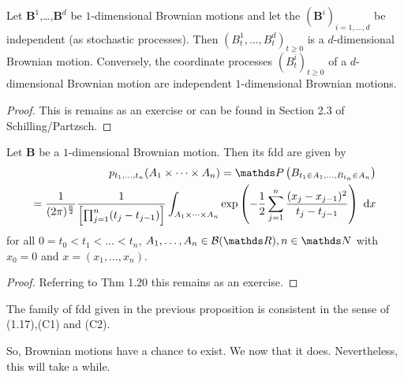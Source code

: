 \begin{prop}
Let $\textbf{B}^1$,\dots,$\textbf{B}^d$ be $1$-dimensional Brownian motions and
let the $(\textbf{B}^i)_{i=1,\dots,d}$ be independent (as stochastic processes).
Then $\left(B_t^1,\dots,B_t^d\right)_{t\geq 0}$ is a $d$-dimensional Brownian motion.
Conversely, the coordinate processes $\left(B_t^i\right)_{t \geq 0}$ of a $d$-dimensional Brownian motion are independent $1$-dimensional Brownian motions.
\end{prop}
\begin{proof}
This is remains as an exercise or can be found in Section 2.3 of Schilling/Partzsch.
\end{proof}

\begin{prop}
Let $\textbf{B}$ be a $1$-dimensional Brownian motion. Then its fdd are given by
\begin{align}
p_{t_1,\dots ,t_n}(A_1\times \dots \times A_n) = \Prob\left(B_{t_1\in A_1,\dots,B_{t_n}\in A_n}  \right) \nonumber \\
=\frac{1}{(2\pi)^{\frac{n}{2}}}\frac{1}{\left[\prod_{j=1}^n(t_j-t_{j-1})\right]} \int_{A_1\times \dots \times A_n} \exp\left(-\frac{1}{2}\sum_{j=1}^n \frac{(x_j-x_{j-1})^2}{t_j-t_{j-1}}\right)~\mathrm{d}x
\end{align}
for all $0=t_0<t_1<\dots < t_n$, $A_1, \dots , A_n \in  \Borel(\R), n\in \N$ with $x_0=0$ and $x=(x_1,\dots , x_n)$.
\end{prop}
\begin{proof}
Referring to Thm 1.20 this remains as an exercise.
\end{proof}

\begin{prop}
The family of fdd given in the previous proposition is consistent in the sense of (1.17),(C1) and (C2).
\end{prop}

So, Brownian motions have a chance to exist. We now that it does. Nevertheless, this will take a while.

